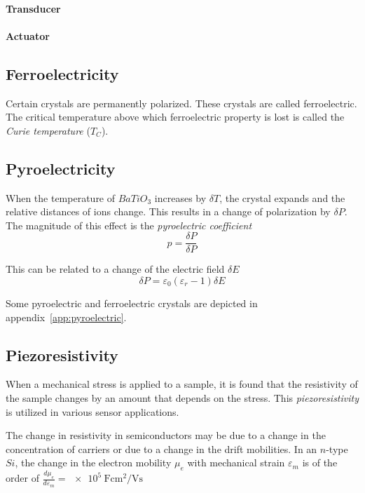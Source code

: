 \paragraph{Transducer}

\paragraph{Actuator}

\subsection{Ferroelectricity}
Certain crystals are permanently polarized. 
These crystals are called ferroelectric.
The critical temperature above which ferroelectric property is lost is called
the \emph{Curie temperature} ($T_C$).

\subsection{Pyroelectricity}
When the temperature of $BaTiO_3$ increases by $\delta T$, the crystal expands
and the relative distances of ions change. This results in a change of 
polarization by $\delta P$. The magnitude of this effect is the 
\emph{pyroelectric coefficient}
\begin{equation}
    p = \frac{\delta P}{\delta P}
\end{equation}

This can be related to a change of the electric field $\delta E$
\begin{equation}
    \delta P = \varepsilon_0 (\varepsilon_r - 1) \delta E
\end{equation}

Some pyroelectric and ferroelectric crystals are depicted in appendix~\ref{app:pyroelectric}.

\subsection{Piezoresistivity}
When a mechanical stress is applied to a sample, it is found that the
resistivity of the sample changes by an amount that depends on the stress.
This \emph{piezoresistivity} is utilized in various sensor applications.

The change in resistivity in semiconductors may be due to a change in the
concentration of carriers or due to a change in the drift mobilities.
In an $n$-type $Si$, the change in the electron mobility $\mu_e$ with
mechanical strain $\varepsilon_m$ is of the order of
$\frac{d\mu_e}{d\varepsilon_m} = \SI{e5}{\farad\centi\meter\squared\per\volt\second}$

